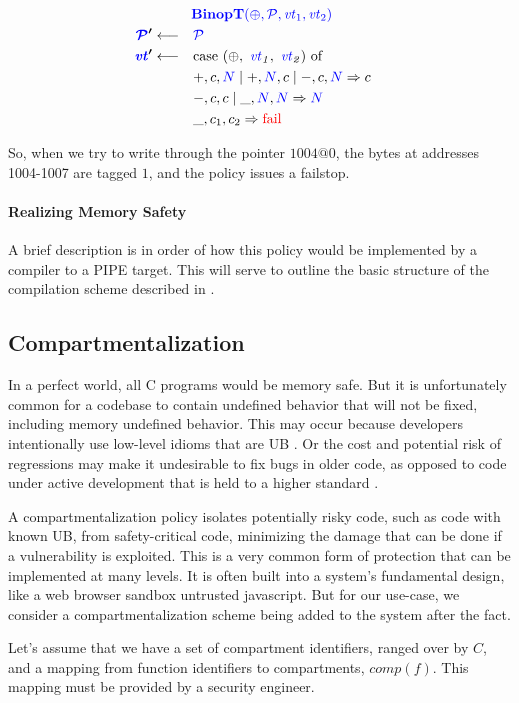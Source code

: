 \documentclass[acmsmall,review,anonymous]{acmart}\settopmatter{printfolios=true,printccs=false,printacmref=false}
\begin{document}
\[\begin{aligned}
\truledef{\binopt}
\settag{\PCT'}{\PCT}
\settag{\vt'}{\caseof{(\oplus,~ \vt_1,~ \vt_2)}}
\caseentry{+, c, \N \mid +, \N, c \mid -, c, \N}{c} \\
\caseentry{-, c, c \mid \_, \N, \N}{\N} \\
\caseentry{\_, c_1, c_2}{\textnormal{\color{red} fail}} \\
\end{aligned}\]

So, when we try to write through the pointer \(1004@0\), the bytes at addresses 1004-1007 are
tagged \(1\), and the policy issues a failstop.

\paragraph*{Realizing Memory Safety}

A brief description is in order of how this policy would be implemented by a compiler to a PIPE
target. This will serve to outline the basic structure of the compilation scheme described in
\cite{Chhak21:Tagine}.

\subsection{Compartmentalization}
\label{sec:comp}
In a perfect world, all C programs would be memory safe. But it is unfortunately common
for a codebase to contain undefined behavior that will not be fixed, including memory undefined
behavior. This may occur because developers intentionally use low-level idioms that are UB \cite{DeFacto}.
Or the cost and potential risk of regressions may make it undesirable to fix bugs in older code,
as opposed to code under active development that is held to a higher standard \cite{Bessey10:Coverity}.

A compartmentalization policy isolates potentially risky code, such as code with known UB,
from safety-critical code, minimizing the damage that can be done if a vulnerability is exploited.
This is a very common form of protection that can be implemented at many levels. It is often built
into a system's fundamental design, like a web browser sandbox untrusted javascript.
But for our use-case, we consider a compartmentalization scheme being added to the system
after the fact.

Let's assume that we have a set of compartment identifiers, ranged over by \(C\), and a mapping
from function identifiers to compartments, \(\mathit{comp}(f)\). This mapping must be provided by
a security engineer.
\end{document}
